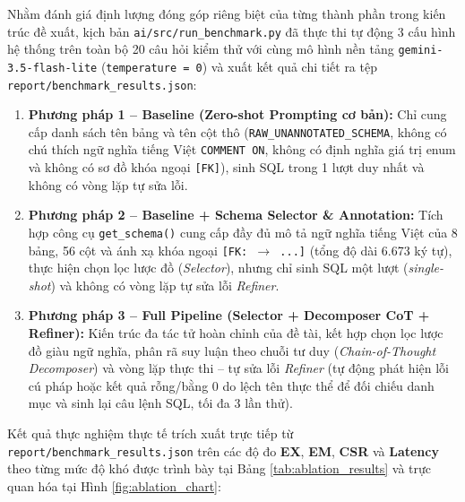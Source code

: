 \documentclass[12pt,a4paper]{report}
\begin{document}
Nhằm đánh giá định lượng đóng góp riêng biệt của từng thành phần trong kiến trúc đề xuất, kịch bản \texttt{ai/src/run\_benchmark.py} đã thực thi tự động 3 cấu hình hệ thống trên toàn bộ 20 câu hỏi kiểm thử với cùng mô hình nền tảng \texttt{gemini-3.5-flash-lite} (\texttt{temperature = 0}) và xuất kết quả chi tiết ra tệp \texttt{report/benchmark\_results.json}:
\begin{enumerate}
    \item \textbf{Phương pháp 1 -- Baseline (Zero-shot Prompting cơ bản):} Chỉ cung cấp danh sách tên bảng và tên cột thô (\texttt{RAW\_UNANNOTATED\_SCHEMA}, không có chú thích ngữ nghĩa tiếng Việt \texttt{COMMENT ON}, không có định nghĩa giá trị enum và không có sơ đồ khóa ngoại \texttt{[FK]}), sinh SQL trong 1 lượt duy nhất và không có vòng lặp tự sửa lỗi.
    \item \textbf{Phương pháp 2 -- Baseline + Schema Selector \& Annotation:} Tích hợp công cụ \texttt{get\_schema()} cung cấp đầy đủ mô tả ngữ nghĩa tiếng Việt của 8 bảng, 56 cột và ánh xạ khóa ngoại \texttt{[FK: $\rightarrow$ ...]} (tổng độ dài 6.673 ký tự), thực hiện chọn lọc lược đồ (\textit{Selector}), nhưng chỉ sinh SQL một lượt (\textit{single-shot}) và không có vòng lặp tự sửa lỗi \textit{Refiner}.
    \item \textbf{Phương pháp 3 -- Full Pipeline (Selector + Decomposer CoT + Refiner):} Kiến trúc đa tác tử hoàn chỉnh của đề tài, kết hợp chọn lọc lược đồ giàu ngữ nghĩa, phân rã suy luận theo chuỗi tư duy (\textit{Chain-of-Thought Decomposer}) và vòng lặp thực thi -- tự sửa lỗi \textit{Refiner} (tự động phát hiện lỗi cú pháp hoặc kết quả rỗng/bằng 0 do lệch tên thực thể để đối chiếu danh mục và sinh lại câu lệnh SQL, tối đa 3 lần thử).
\end{enumerate}

Kết quả thực nghiệm thực tế trích xuất trực tiếp từ \texttt{report/benchmark\_results.json} trên các độ đo \textbf{EX}, \textbf{EM}, \textbf{CSR} và \textbf{Latency} theo từng mức độ khó được trình bày tại Bảng \ref{tab:ablation_results} và trực quan hóa tại Hình \ref{fig:ablation_chart}:
\end{document}

